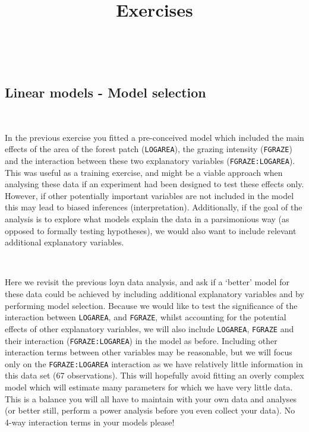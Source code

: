 \documentclass[
]{article}
\title{Exercises}
\author{}
\date{\vspace{-2.5em}}
\begin{document}
\maketitle

~

\subsection{Linear models - Model
selection}\label{linear-models---model-selection}

~

In the previous exercise you fitted a pre-conceived model which included
the main effects of the area of the forest patch (\texttt{LOGAREA}), the
grazing intensity (\texttt{FGRAZE}) and the interaction between these
two explanatory variables (\texttt{FGRAZE:LOGAREA}). This was useful as
a training exercise, and might be a viable approach when analysing these
data if an experiment had been designed to test these effects only.
However, if other potentially important variables are not included in
the model this may lead to biased inferences (interpretation).
Additionally, if the goal of the analysis is to explore what models
explain the data in a parsimonious way (as opposed to formally testing
hypotheses), we would also want to include relevant additional
explanatory variables.

~

Here we revisit the previous loyn data analysis, and ask if a `better'
model for these data could be achieved by including additional
explanatory variables and by performing model selection. Because we
would like to test the significance of the interaction between
\texttt{LOGAREA}, and \texttt{FGRAZE}, whilst accounting for the
potential effects of other explanatory variables, we will also include
\texttt{LOGAREA}, \texttt{FGRAZE} and their interaction
(\texttt{FGRAZE:LOGAREA}) in the model as before. Including other
interaction terms between other variables may be reasonable, but we will
focus only on the \texttt{FGRAZE:LOGAREA} interaction as we have
relatively little information in this data set (67 observations). This
will hopefully avoid fitting an overly complex model which will estimate
many parameters for which we have very little data. This is a balance
you will all have to maintain with your own data and analyses (or better
still, perform a power analysis before you even collect your data). No
4-way interaction terms in your models please!

~
\end{document}
